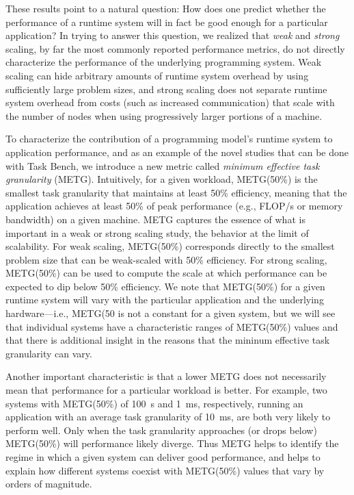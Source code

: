 These results point to a natural question:   How does one predict whether the performance of a runtime
system will in fact be good enough for a particular application?  In trying to answer this question,
we realized that \emph{weak} and \emph{strong} scaling, by far the most commonly
reported performance metrics, do not directly characterize the performance of the underlying
programming system. Weak scaling can hide arbitrary amounts of runtime
system overhead by using sufficiently large problem sizes, and strong
scaling does not separate runtime system overhead from costs
(such as increased communication) that scale with the number of nodes when
using progressively larger portions of a machine. 

To characterize the contribution of a programming model's runtime
system to application performance, and as an example of the novel studies that can be done
with Task Bench, we introduce a new metric called
\emph{minimum effective task granularity} (METG). Intuitively, for a given
workload, METG(50\%) is the smallest task granularity that maintains
at least 50\% efficiency, meaning that the application achieves at
least 50\% of peak performance (e.g., FLOP/s or memory bandwidth) on a
given machine. METG captures the essence of what is important in a
weak or strong scaling study, the behavior at the limit of
scalability. For weak scaling, METG(50\%) corresponds directly to the
smallest problem size that can be weak-scaled with 50\%
efficiency. For strong scaling, METG(50\%) can be used to compute the
scale at which performance can be expected to dip below 50\%
efficiency.  We note that METG(50\%) for a given runtime system will
vary with the particular application and the underlying hardware---i.e., METG(50%
is not a constant for a given system, but we will see that individual systems have
a characteristic ranges of METG(50\%) values and that there is additional insight
in the reasons that the mininum effective task granularity can vary.

Another important characteristic is that a lower METG does not necessarily mean that 
performance for a particular workload is better. For example, two systems with METG(50\%) of 100~\textmu{}s and 1~ms,
respectively, running an application with an average task granularity
of 10~ms, are both very likely to perform well. Only when the task
granularity approaches (or drops below) METG(50\%) will performance
likely diverge. Thus METG helps to identify the regime in which a
given system can deliver good performance, and helps to explain how
different systems coexist with METG(50\%) values that vary by orders of magnitude.

